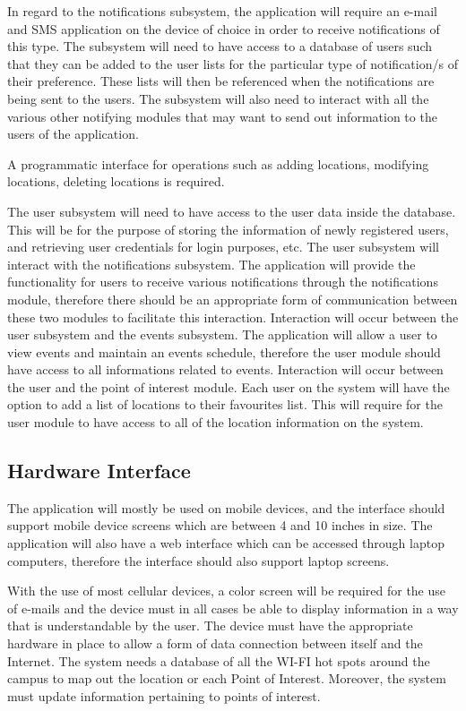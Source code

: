\documentclass{article}
\begin{document}
In regard to the notifications subsystem, the application will require an e-mail and SMS application on the device of choice in order to receive notifications of this type.
The subsystem will need to have access to a database of users such that they can be added to the user lists for the particular type of notification/s of their preference. These lists will then be referenced when the notifications are being sent to the users. The subsystem will also need to interact with all the various other notifying modules that may want to send out information to the users of the application.

A programmatic interface for operations such as adding locations, modifying locations, deleting locations is required.

\clearpage
The user subsystem will need to have access to the user data inside the database. This will be for the purpose of storing the information of newly registered users, and retrieving user credentials for login purposes, etc. The user subsystem will interact with the notifications subsystem. The application will provide the functionality for users to receive various notifications through the notifications module, therefore there should be an appropriate form of communication between these two modules to facilitate this interaction. Interaction will occur between the user subsystem and the events subsystem. The application will allow a user to view events and maintain an events schedule, therefore the user module should have access to all informations related to events. Interaction will occur between the user and the point of interest module. Each user on the system will have the option to add a list of locations to their favourites list. This will require for the user module to have access to all of the location information on the system.

\subsection{Hardware Interface}

The application will mostly be used on mobile devices, and the interface should support mobile device screens which are between 4 and 10 inches in size. The application will also have a web interface which can be accessed through laptop computers, therefore the interface should also support laptop screens.

\bigskip
With the use of most cellular devices, a color screen will be required for the use of e-mails and the device must in all cases be able to display information in a way that is understandable by the user.
The device must have the appropriate hardware in place to allow a form of data connection between itself and the Internet.
The system needs a database of all the WI-FI hot spots around the campus to map out the location or each Point of Interest. Moreover, the system must update information pertaining to points of interest.
\end{document}
